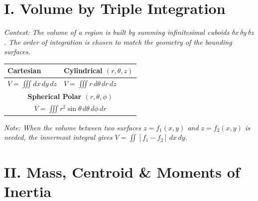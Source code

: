 \documentclass[11pt, a4paper]{article}
\begin{document}
\begin{center}
\end{center}


\section*{\color{primary} I. Volume by Triple Integration}

\textit{\small Context: The volume of a region is built by summing infinitesimal cuboids $\delta x\,\delta y\,\delta z$. The order of integration is chosen to match the geometry of the bounding surfaces.}

\begin{center}
\begin{tabular}{@{}p{} p{}@{}}
\toprule
\textbf{Cartesian} & \textbf{Cylindrical $(r,\theta,z)$} \\
\midrule
$V = \displaystyle\iiint dx\,dy\,dz$ & $V = \displaystyle\iiint r\,d\theta\,dr\,dz$ \\
\midrule
\multicolumn{2}{c}{\textbf{Spherical Polar $(r,\theta,\phi)$}} \\
\midrule
\multicolumn{2}{c}{$V = \displaystyle\iiint r^2 \sin\theta\,d\theta\,d\phi\,dr$} \\
\bottomrule
\end{tabular}
\end{center}

\vspace{0.2cm}

\textit{\small Note: When the volume between two surfaces $z=f_1(x,y)$ and $z=f_2(x,y)$ is needed, the innermost integral gives $V = \iint [f_1 - f_2]\,dx\,dy$.}

\vspace{0.3cm}

\section*{\color{primary} II. Mass, Centroid \& Moments of Inertia}
\end{document}
